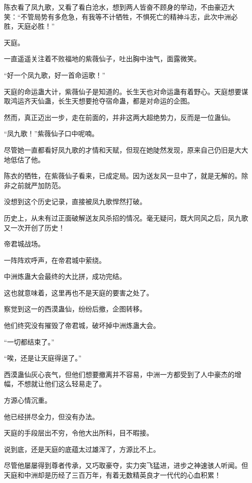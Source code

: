 \begin{this_body}
陈衣看了凤九歌，又看了看白沧水，想到两人皆奋不顾身的举动，不由豪迈大笑：“不管局势有多危急，有我等不计牺牲，不惧死亡的精神斗志，此次中洲必胜，天庭必胜！”

天庭。

一直遥遥关注着不败福地的紫薇仙子，吐出胸中浊气，面露微笑。

“好一个凤九歌，好一首命运歌！”

天庭的命运蛊大计，紫薇仙子是知道的。长生天也对命运蛊有着野心。天庭想要谋取鸿运齐天仙蛊，长生天想要抢夺宿命蛊，都是对命运的企图。

然而，真正迈出一步，走在前面的，并非这两大超绝势力，反而是一位蛊仙。

“凤九歌！”紫薇仙子口中呢喃。

尽管她一直都看好凤九歌的才情和天赋，但现在她陡然发现，原来自己仍旧是大大地低估了他。

陈衣的牺牲，在紫薇仙子看来，已成定局。因为送友风一旦中了，就是无解的。除非之前就严加防范。

没想到这个历史记录，直接被凤九歌悍然打破。

历史上，从未有过正面破解送友风杀招的情况。毫无疑问，既大同风之后，凤九歌又一次开创了历史！

帝君城战场。

一阵阵欢呼声，在帝君城中萦绕。

中洲炼蛊大会最终的大比拼，成功完结。

这也就意味着，这里再也不是天庭的要害之处了。

察觉到这一的西漠蛊仙，纷纷后撤，企图转移。

他们终究没有摧毁了帝君城，破坏掉中洲炼蛊大会。

“一切都结束了。”

“唉，还是让天庭得逞了。”

西漠蛊仙灰心丧气，但他们想要撤离并不容易，中洲一方都受到了人中豪杰的增幅，不想就让他们这么轻易走了。

方源心情沉重。

他已经拼尽全力，但没有办法。

天庭的手段层出不穷，令他大出所料，目不暇接。

说到底，还是天庭的底蕴太过雄浑了，方源比不上。

尽管他屡屡得到尊者传承，又巧取豪夺，实力突飞猛进，进步之神速骇人听闻。但天庭和中洲却是历经了三百万年，有着无数精英良才一代代的心血积累！

\end{this_body}

